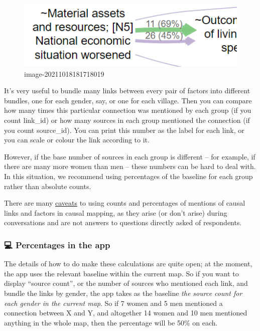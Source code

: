 \documentclass[
]{book}
\begin{document}
\begin{figure}
\centering
\includegraphics{_assets/image-20211018181718019.png}
\caption{image-20211018181718019}
\end{figure}

It's very useful to bundle many links between every pair of factors into different bundles, one for each gender, say, or one for each village. Then you can compare how many times this particular connection was mentioned by each group (if you count link\_id) or how many sources in each group mentioned the connection (if you count source\_id). You can print this number as the label for each link, or you can scale or colour the link according to it.

However, if the base number of sources in each group is different -- for example, if there are many more women than men -- these numbers can be hard to deal with. In this situation, we recommend using percentages of the baseline for each group rather than absolute counts.

There are many \protect\hyperlink{caveat-numbers}{caveats} to using counts and percentages of mentions of causal links and factors in causal mapping, as they arise (or don't arise) during conversations and are not answers to questions directly asked of respondents.

\hypertarget{percentages-in-the-app}{%
\subsubsection{💻 Percentages in the app}\label{percentages-in-the-app}}

The details of how to do make these calculations are quite open; at the moment, the app uses the relevant baseline within the current map. So if you want to display ``source count'', or the number of sources who mentioned each link, and bundle the links by gender, the app takes as the baseline \emph{the source count for each gender in the current map}. So if 7 women and 5 men mentioned a connection between X and Y, and altogether 14 women and 10 men mentioned anything in the whole map, then the percentage will be 50\% on each.
\end{document}
